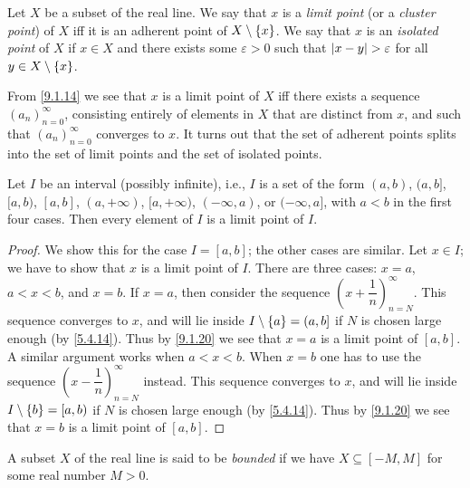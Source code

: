 \begin{defn}\label{9.1.18}
	Let \(X\) be a subset of the real line.
	We say that \(x\) is a \emph{limit point} (or a \emph{cluster point}) of \(X\) iff it is an adherent point of \(X \setminus \left\lbrace x\right\rbrace\).
	We say that \(x\) is an \emph{isolated point} of \(X\) if \(x \in X\) and there exists some \(\varepsilon > 0\) such that \(\left\lvert x - y\right\rvert > \varepsilon\) for all \(y \in X \setminus \left\lbrace x\right\rbrace\).
\end{defn}

\setcounter{thm}{19}
\begin{rmk}\label{9.1.20}
	From \cref{9.1.14} we see that \(x\) is a limit point of \(X\) iff there exists a sequence \((a_n)_{n = 0}^\infty\), consisting entirely of elements in \(X\) that are distinct from \(x\), and such that \((a_n)_{n = 0}^\infty\) converges to \(x\).
	It turns out that the set of adherent points splits into the set of limit points and the set of isolated points.
\end{rmk}

\begin{lem}\label{9.1.21}
	Let \(I\) be an interval (possibly infinite), i.e., \(I\) is a set of the form \((a, b)\), \((a, b]\), \([a, b)\), \([a, b]\), \((a, +\infty)\), \([a, +\infty)\), \((-\infty, a)\), or \((-\infty, a]\), with \(a < b\) in the first four cases.
	Then every element of \(I\) is a limit point of \(I\).
\end{lem}

\begin{proof}
	We show this for the case \(I = [a, b]\);
	the other cases are similar.
	Let \(x \in I\);
	we have to show that \(x\) is a limit point of \(I\).
	There are three cases: \(x = a\), \(a < x < b\), and \(x = b\).
	If \(x = a\), then consider the sequence \((x + \dfrac{1}{n})_{n = N}^\infty\).
	This sequence converges to \(x\), and will lie inside \(I \setminus \left\lbrace a\right\rbrace = (a, b]\) if \(N\) is chosen large enough (by \cref{5.4.14}).
	Thus by \cref{9.1.20} we see that \(x = a\) is a limit point of \([a, b]\).
	A similar argument works when \(a < x < b\).
	When \(x = b\) one has to use the sequence \((x - \dfrac{1}{n})_{n = N}^\infty\) instead.
	This sequence converges to \(x\), and will lie inside \(I \setminus \left\lbrace b\right\rbrace = [a, b)\) if \(N\) is chosen large enough (by \cref{5.4.14}).
	Thus by \cref{9.1.20} we see that \(x = b\) is a limit point of \([a, b]\).
\end{proof}

\begin{defn}\label{9.1.22}
	A subset \(X\) of the real line is said to be \emph{bounded} if we have \(X \subseteq [-M, M]\) for some real number \(M > 0\).
\end{defn}

